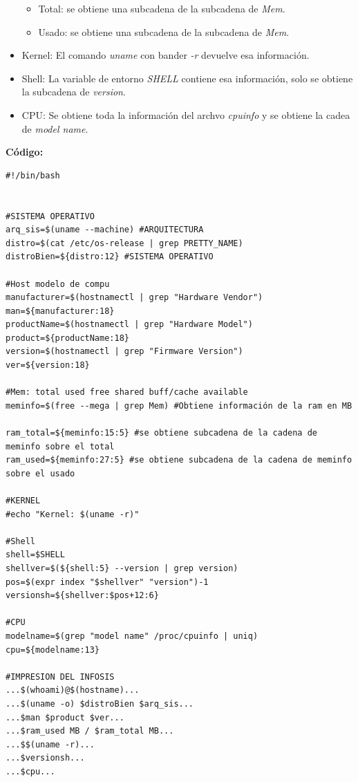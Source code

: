 \documentclass[letter,12pt]{article} %
\begin{document}
\begin{itemize}
    \begin{itemize}
        \item Total: se obtiene una subcadena de la subcadena de \textit{Mem}.
        \item Usado: se obtiene una subcadena de la subcadena de \textit{Mem}.
    \end{itemize}
    \item Kernel: El comando \textit{uname} con bander \textit{-r} devuelve esa información.
    \item Shell: La variable de entorno \textit{\textdollar SHELL} contiene esa información, solo se obtiene la subcadena de \textit{version}.
    \item CPU: Se obtiene toda la información del archvo \textit{cpuinfo} y se obtiene la cadea de \textit{model name}.
\end{itemize}
\textbf{Código:} \par
\begin{lstlisting}[style=BashInputStyle]
#!/bin/bash


#SISTEMA OPERATIVO
arq_sis=$(uname --machine) #ARQUITECTURA
distro=$(cat /etc/os-release | grep PRETTY_NAME)
distroBien=${distro:12} #SISTEMA OPERATIVO

#Host modelo de compu
manufacturer=$(hostnamectl | grep "Hardware Vendor")
man=${manufacturer:18}
productName=$(hostnamectl | grep "Hardware Model")
product=${productName:18}
version=$(hostnamectl | grep "Firmware Version")
ver=${version:18}

#Mem: total used free shared buff/cache available
meminfo=$(free --mega | grep Mem) #Obtiene información de la ram en MB

ram_total=${meminfo:15:5} #se obtiene subcadena de la cadena de meminfo sobre el total
ram_used=${meminfo:27:5} #se obtiene subcadena de la cadena de meminfo sobre el usado

#KERNEL
#echo "Kernel: $(uname -r)"

#Shell
shell=$SHELL
shellver=$(${shell:5} --version | grep version)
pos=$(expr index "$shellver" "version")-1
versionsh=${shellver:$pos+12:6}

#CPU
modelname=$(grep "model name" /proc/cpuinfo | uniq)
cpu=${modelname:13}

#IMPRESION DEL INFOSIS
...$(whoami)@$(hostname)...
...$(uname -o) $distroBien $arq_sis...
...$man $product $ver...
...$ram_used MB / $ram_total MB...
...$$(uname -r)...
...$versionsh...
...$cpu...

\end{lstlisting}
\end{document}
